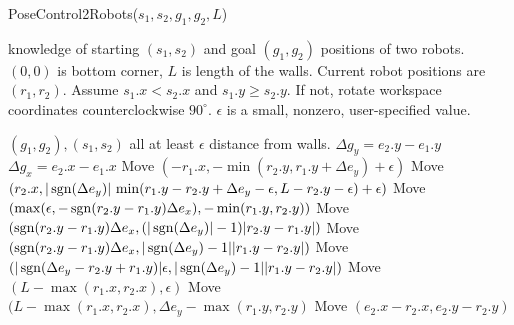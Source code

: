 \begin{algorithm}
\caption{PoseControl2Robots($s_1,s_2,g_1,g_2,L$)}\label{alg:PosControl2Robots}
\begin{algorithmic}[1]
\scriptsize
\Require knowledge of starting $(s_1,s_2)$ and goal $(g_1,g_2)$ positions of  two robots. 
$(0,0)$ is bottom corner,
 $L$ is length of the walls. Current robot positions are $(r_1,r_2)$.
 Assume $s_1.x < s_2.x$ and $s_1.y \geq s_2.y$. If not, rotate workspace coordinates counterclockwise $90^{\circ}$.
$\epsilon $ is a small, nonzero, user-specified value.
 
\Ensure $(g_1, g_2) , (s_1, s_2)$ all at least $\epsilon$ distance from walls.
\State $\Delta g_y = e_2.y - e_1.y$
\State $\Delta g_x = e_2.x - e_1.x$
\State Move $\left(-r_1.x , -\min \left(r_2.y , r_1.y+ \Delta e_y \right)+\epsilon \right)$ 
\State Move $ (r_2.x, |\operatorname{sgn}(\Delta e_y)| \, \min(r_1.y - r_2.y + \Delta e_y-\epsilon,L-r_2.y-\epsilon)+ \epsilon)$
\Statex {}
\State Move $(\max(\epsilon, -\operatorname{sgn}(r_2.y - r_1.y)\Delta e_x), -\min(r_1.y , r_2.y))$ 
\Statex {}
\State Move $(\operatorname{sgn}(r_2.y - r_1.y)\Delta e_x , (|\operatorname{sgn}(\Delta e_y)|-1) |r_2.y - r_1.y|)$ 
\State Move $(\operatorname{sgn}(r_2.y- r_1.y)\Delta e_x, |\operatorname{sgn}(\Delta e_y)-1| |r_1.y-r_2.y|)$ 
\Else
\State Move  $(|\operatorname{sgn}(\Delta e_y -r_2.y+ r_1.y)| \epsilon, |\operatorname{sgn}(\Delta e_y)-1| |r_1.y-r_2.y|)$ 
\EndIf
\State Move $(L - \max(r_1.x, r_2.x), \epsilon)$
\Else 
\State Move $(L - \max(r_1.x, r_2.x),\Delta e_y -\max(r_1.y, r_2.y)$ 
\Statex {}
\EndIf
\EndIf
\State Move $(e_2.x - r_2.x, e_2.y - r_2.y)$ 
\end{algorithmic}
\end{algorithm}






